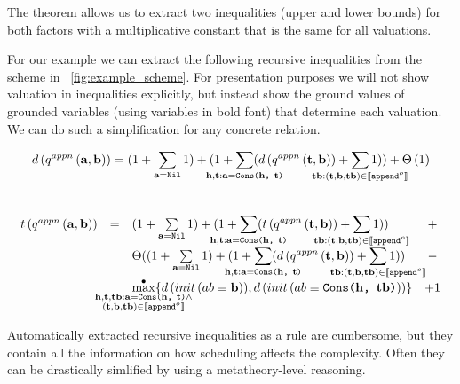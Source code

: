 The theorem allows us to extract two inequalities (upper and lower bounds) for both factors with a multiplicative constant that is the same for all valuations.

For our example we can extract the following recursive inequalities from the scheme in \figureword~\ref{fig:example_scheme}. For presentation purposes we will
not show valuation in inequalities explicitly, but instead show the ground values of grounded variables (using variables in bold font) that determine each valuation.
We can do such a simplification for any concrete relation.

\[
d\,(q^{appn}\,(\mathbf{a}, \mathbf{b}))  = (1 + \sum\limits_{\mathbf{a} = \texttt{Nil}} 1) + (1 + \smashoperator{\sum\limits_{\mathbf{h}, \mathbf{t}: \mathbf{a} = \texttt{Cons($\mathbf{h}$, $\mathbf{t}$)}}} (d\,(q^{appn}\,(\mathbf{t}, \mathbf{b})) + \smashoperator{\sum\limits_{\mathbf{tb} : (\mathbf{t}, \mathbf{b}, \mathbf{tb}) \in \llbracket \texttt{append$^o$} \rrbracket}} 1)) + \Theta\,(1)
\]\\[0.8mm]
\[
\begin{array}{lclc}
t\,(q^{appn}\,(\mathbf{a}, \mathbf{b})) & = & (1 + \sum\limits_{\mathbf{a} = \texttt{Nil}} 1) + (1 + \smashoperator{\sum\limits_{\mathbf{h}, \mathbf{t}: \mathbf{a} = \texttt{Cons($\mathbf{h}$, $\mathbf{t}$)}}} (t\,(q^{appn}\,(\mathbf{t}, \mathbf{b})) + \smashoperator{\sum\limits_{\mathbf{tb} : (\mathbf{t}, \mathbf{b}, \mathbf{tb}) \in \llbracket \texttt{append$^o$} \rrbracket}} 1)) & + \\
 & &\Theta((1 + \sum\limits_{\mathbf{a} = \texttt{Nil}} 1) + (1 + \smashoperator{\sum\limits_{\mathbf{h}, \mathbf{t}: \mathbf{a} = \texttt{Cons($\mathbf{h}$, $\mathbf{t}$)}}} (d\,(q^{appn}\,(\mathbf{t}, \mathbf{b})) + \smashoperator{\sum\limits_{\mathbf{tb} : (\mathbf{t}, \mathbf{b}, \mathbf{tb}) \in \llbracket \texttt{append$^o$} \rrbracket}} 1)) & - \\
& & \smashoperator{\maxd\limits_{\substack{
                                   \mathbf{h}, \mathbf{t}, \mathbf{tb}: \mathbf{a} = \texttt{Cons($\mathbf{h}$, $\mathbf{t}$)} \land \\
                                   (\mathbf{t}, \mathbf{b}, \mathbf{tb}) \in \llbracket \texttt{append$^o$} \rrbracket
                                 }
                                }} \{ d\,(init\,(\unigoal{ab}{\mathbf{b}})), d\,(init\,(\unigoal{ab}{\texttt{Cons($\mathbf{h}$, $\mathbf{tb}$)}})) \} & + 1 
\end{array}
\]


Automatically extracted recursive inequalities as a rule are cumbersome, but they contain all the information on how scheduling affects the complexity.
Often they can be drastically simlified by using a metatheory-level reasoning.

